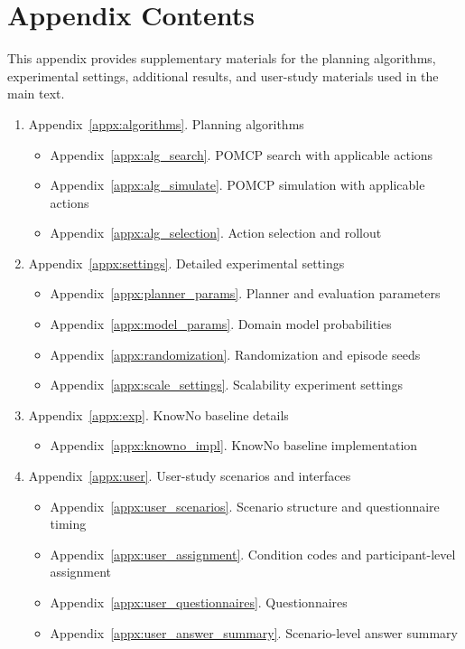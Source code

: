 \setcounter{secnumdepth}{3}
\section*{Appendix Contents}
This appendix provides supplementary materials for the planning algorithms, experimental settings, additional results, and user-study materials used in the main text.

\begin{enumerate}
  \item Appendix~\ref{appx:algorithms}. Planning algorithms
  \begin{itemize}
    \item Appendix~\ref{appx:alg_search}. POMCP search with applicable actions
    \item Appendix~\ref{appx:alg_simulate}. POMCP simulation with applicable actions
    \item Appendix~\ref{appx:alg_selection}. Action selection and rollout
  \end{itemize}

  \item Appendix~\ref{appx:settings}. Detailed experimental settings
  \begin{itemize}
    \item Appendix~\ref{appx:planner_params}. Planner and evaluation parameters
    \item Appendix~\ref{appx:model_params}. Domain model probabilities
    \item Appendix~\ref{appx:randomization}. Randomization and episode seeds
    \item Appendix~\ref{appx:scale_settings}. Scalability experiment settings
  \end{itemize}

  \item Appendix~\ref{appx:exp}. KnowNo baseline details
  \begin{itemize}
    \item Appendix~\ref{appx:knowno_impl}. KnowNo baseline implementation
  \end{itemize}

  \item Appendix~\ref{appx:user}. User-study scenarios and interfaces
  \begin{itemize}
    \item Appendix~\ref{appx:user_scenarios}. Scenario structure and questionnaire timing
    \item Appendix~\ref{appx:user_assignment}. Condition codes and participant-level assignment
    \item Appendix~\ref{appx:user_questionnaires}. Questionnaires
    \item Appendix~\ref{appx:user_answer_summary}. Scenario-level answer summary
  \end{itemize}
\end{enumerate}
